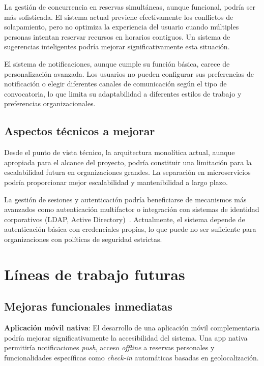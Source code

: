 La gestión de concurrencia en reservas simultáneas, aunque funcional, podría ser más sofisticada. El sistema actual previene efectivamente los conflictos de solapamiento, pero no optimiza la experiencia del usuario cuando múltiples personas intentan reservar recursos en horarios contiguos. Un sistema de sugerencias inteligentes podría mejorar significativamente esta situación.

El sistema de notificaciones, aunque cumple su función básica, carece de personalización avanzada. Los usuarios no pueden configurar sus preferencias de notificación o elegir diferentes canales de comunicación según el tipo de convocatoria, lo que limita su adaptabilidad a diferentes estilos de trabajo y preferencias organizacionales.

\subsection{Aspectos técnicos a mejorar}\label{aspectos-tecnicos-mejorar}
Desde el punto de vista técnico, la arquitectura monolítica actual, aunque apropiada para el alcance del proyecto, podría constituir una limitación para la escalabilidad futura en organizaciones grandes. La separación en microservicios podría proporcionar mejor escalabilidad y mantenibilidad a largo plazo.

La gestión de sesiones y autenticación podría beneficiarse de mecanismos más avanzados como autenticación multifactor o integración con sistemas de identidad corporativos (LDAP, Active Directory)~\cite{ldap-active-directory}. Actualmente, el sistema depende de autenticación básica con credenciales propias, lo que puede no ser suficiente para organizaciones con políticas de seguridad estrictas.

\section{Líneas de trabajo futuras}\label{lineas-trabajo-futuras}
\subsection{Mejoras funcionales inmediatas}\label{mejoras-funcionales-inmediatas}
\textbf{Aplicación móvil nativa}: El desarrollo de una aplicación móvil complementaria podría mejorar significativamente la accesibilidad del sistema. Una app nativa permitiría notificaciones \emph{push}, acceso \emph{offline} a reservas personales y funcionalidades específicas como \emph{check-in} automáticas basadas en geolocalización.

